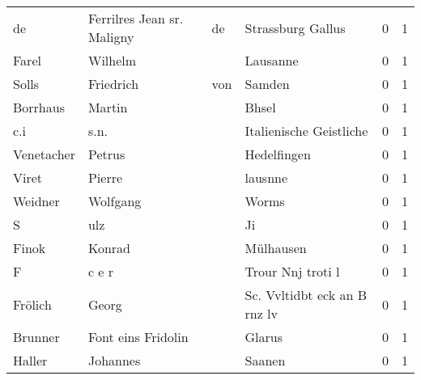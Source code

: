 \begin{center}
\begin{tiny}
\begin{longtabu}{llllrr}
                       de &         Ferrilres Jean sr. Maligny &          de &                           Strassburg Gallus &          0 &         1 \\
                    Farel &                            Wilhelm &             &                                    Lausanne &          0 &         1 \\
                    Solls &                          Friedrich &         von &                                      Samden &          0 &         1 \\
                 Borrhaus &                             Martin &             &                                       Bhsel &          0 &         1 \\
                      c.i &                               s.n. &             &                     Italienische Geistliche &          0 &         1 \\
               Venetacher &                             Petrus &             &                                 Hedelfingen &          0 &         1 \\
                    Viret &                             Pierre &             &                                     lausnne &          0 &         1 \\
                  Weidner &                           Wolfgang &             &                                       Worms &          0 &         1 \\
                        S &                                ulz &             &                                          Ji &          0 &         1 \\
                    Finok &                             Konrad &             &                                   Mülhausen &          0 &         1 \\
                        F &                              c e r &             &                           Trour Nnj troti l &          0 &         1 \\
                  Frölich &                              Georg &             &                Sc. Vvltidbt eck an B rnz lv &          0 &         1 \\
                  Brunner &                 Font eins Fridolin &             &                                      Glarus &          0 &         1 \\
                   Haller &                           Johannes &             &                                      Saanen &          0 &         1 \\

\end{longtabu}
\end{tiny}
\end{center}
